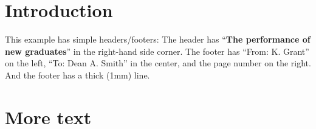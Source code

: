\documentclass{article}
\begin{document}
\section{Introduction}

This example has simple headers/footers:
The header has {``\textbf{The performance of new graduates}''} in the right-hand side corner.
The footer has ``From: K. Grant'' on the left, ``To: Dean A. Smith'' in the center, and the page number on the right. And the footer has a thick (1mm) line.

\section{More text}

\lipsum
\end{document}
